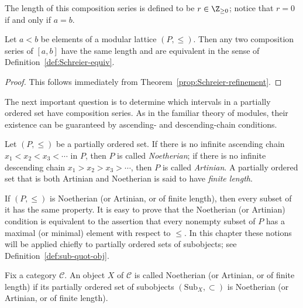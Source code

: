 The length of this composition series is defined to be
$r\in\Z_{\geq0}$; notice that $r=0$ if and only if $a=b$.

\begin{theorem}\label{prop:lattice-JH}
	Let $a<b$ be elements of a modular lattice $(P,\leq)$. Then any two
	composition series of $[a,b]$ have the same length and are equivalent in
	the sense of Definition~\ref{def:Schreier-equiv}.
\end{theorem}
\begin{proof}
	This follows immediately from
	Theorem~\ref{prop:Schreier-refinement}.
\end{proof}

The next important question is to determine which intervals in a partially
ordered set have composition series. As in the familiar theory of modules,
their existence can be guaranteed by ascending- and descending-chain
conditions.

\begin{definition}\label{def:lattice-Noether-Artin}
	Let $(P,\leq)$ be a partially ordered set. If there is no infinite
	ascending chain $x_1<x_2<x_3<\cdots$ in $P$, then $P$ is called
	\emph{Noetherian}; if there is no infinite descending chain
	$x_1>x_2>x_3>\cdots$, then $P$ is called \emph{Artinian}. A partially
	ordered set that is both Artinian and Noetherian is said to have
	\emph{finite length}.
\end{definition}

If $(P,\leq)$ is Noetherian (or Artinian, or of finite length), then every
subset of it has the same property. It is easy to prove that the Noetherian
(or Artinian) condition is equivalent to the assertion that every nonempty
subset of $P$ has a maximal (or minimal) element with respect to $\leq$. In
this chapter these notions will be applied chiefly to partially ordered sets
of subobjects; see Definition~\ref{def:sub-quot-obj}.

\begin{definition}\label{def:finite-length-object}
	Fix a category $\mathcal{C}$. An object $X$ of $\mathcal{C}$ is called
	Noetherian (or Artinian, or of finite length) if its partially ordered set
	of subobjects $(\mathrm{Sub}_X,\subset)$ is Noetherian (or Artinian, or of
	finite length).
\end{definition}

